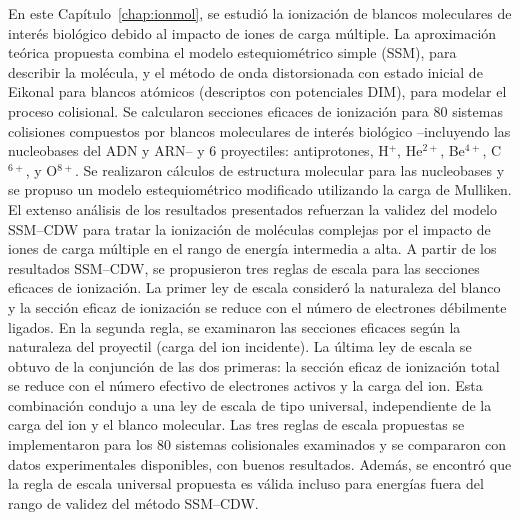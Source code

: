 
En este Capítulo~\ref{chap:ionmol}, se estudió la ionización de blancos 
moleculares de interés biológico debido al impacto de iones de carga 
múltiple. La aproximación teórica propuesta combina el modelo 
estequiométrico simple (SSM), para describir la molécula, y el método de 
onda distorsionada con estado inicial de Eikonal para blancos atómicos 
(descriptos con potenciales DIM), para modelar el proceso colisional. Se 
calcularon secciones eficaces de ionización para 80 sistemas colisiones
compuestos por blancos moleculares de interés biológico --incluyendo 
las nucleobases del ADN y ARN-- y 6 proyectiles: antiprotones, H$^{+}$, 
He$^{2+}$, Be$^{4+}$, C$^{6+}$, y O$^{8+}$. 
Se realizaron cálculos de estructura molecular para las nucleobases y se 
propuso un modelo estequiométrico modificado utilizando la carga de 
Mulliken. El extenso análisis de los resultados 
presentados refuerzan la validez del modelo SSM--CDW para tratar la 
ionización de moléculas complejas por el impacto de iones de carga 
múltiple en el rango de energía intermedia a alta. 
A partir de los resultados SSM--CDW, se propusieron tres reglas de 
escala para las secciones eficaces de ionización. 
La primer ley de escala consideró la naturaleza del blanco y la sección 
eficaz de ionización se reduce con el número de electrones débilmente 
ligados. En la segunda regla, se examinaron las secciones eficaces según 
la naturaleza del proyectil (carga del ion incidente). La última ley de 
escala se obtuvo de la conjunción de las dos primeras: la sección eficaz 
de ionización total se reduce con el número efectivo de electrones 
activos y la carga del ion. Esta combinación condujo a una 
ley de escala de tipo universal, independiente de la carga del ion y el 
blanco molecular. Las tres reglas de escala propuestas se implementaron 
para los 80 sistemas colisionales examinados y se compararon con datos 
experimentales disponibles, con buenos resultados. 
Además, se encontró que la regla de escala universal propuesta es válida 
incluso para energías fuera del rango de validez del método SSM--CDW.


